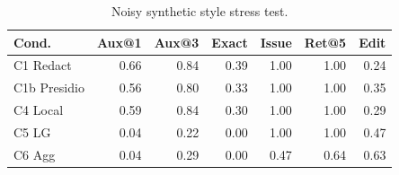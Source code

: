 \begin{table}[t]
\centering
\small
\setlength{\tabcolsep}{3pt}
\caption{Noisy synthetic style stress test.}
\label{tab:noisy_style_stress}
\begin{tabular}{lrrrrrr}
\toprule
Cond. & Aux@1 & Aux@3 & Exact & Issue & Ret@5 & Edit \\
\midrule
C1 Redact & 0.66 & 0.84 & 0.39 & 1.00 & 1.00 & 0.24 \\
C1b Presidio & 0.56 & 0.80 & 0.33 & 1.00 & 1.00 & 0.35 \\
C4 Local & 0.59 & 0.84 & 0.30 & 1.00 & 1.00 & 0.29 \\
C5 LG & 0.04 & 0.22 & 0.00 & 1.00 & 1.00 & 0.47 \\
C6 Agg & 0.04 & 0.29 & 0.00 & 0.47 & 0.64 & 0.63 \\
\bottomrule
\end{tabular}
\end{table}
